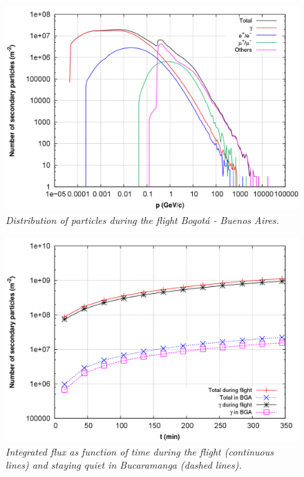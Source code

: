 \documentclass[3p,times,twocolumn]{elsarticle}
\begin{document}
\begin{figure}[H]
\centering
\includegraphics[scale=.14]{figures/g3_flujototal.png}
\caption{\textit{Distribution of particles during the flight Bogot\'a - Buenos Aires.}}
\label{fig:distribution_bta_bsas}
\end{figure}
\begin{figure}[H]
\centering
\includegraphics[scale=.14]{figures/g4_dosetime.png}
\caption{\textit{Integrated flux as function of time during the flight (continuous lines) and staying quiet in Bucaramanga (dashed lines).}}
\label{fig:integrated_bta_bsas}
\end{figure}
\end{document}
